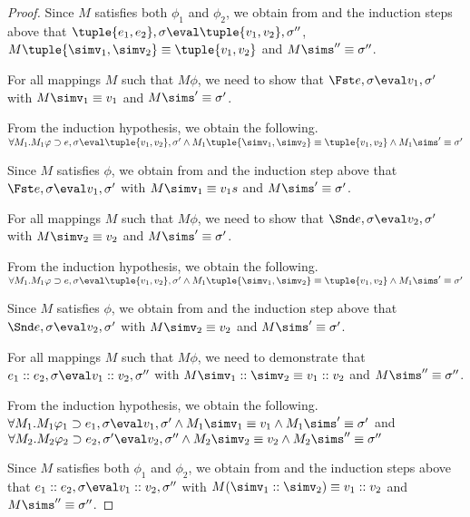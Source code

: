 \begin{proof}
{    Since $M$ satisfies both $\phi_1$ and $\phi_2$,
    we obtain from  and the induction steps above that $\tuple{e_1,e_2},\sigma\eval\tuple{v_1,v_2},\sigma''$, $M\tuple{\simv_1,\simv_2} \equiv \tuple{{v_1},{v_2}}$ and $M\sims''\equiv\sigma''$.
    }

{
  For all mappings $M$ such that $M\phi$, we need to show that
  $\Fst e,\sigma\eval v_1,\sigma'$ with
  $M \simv_1\equiv {v_1}$ and $M\sims'\equiv{\sigma'}$.

  From the induction hypothesis, we obtain the following.\\
  $\forall M_1 . M_1\phi \implies e,\sigma\eval\tuple{v_1,v_2},\sigma'\land M_1\tuple{\simv_1,\simv_2}\equiv \tuple{{v_1},{v_2}}\land M_1\sims'\equiv{\sigma'}$

  Since $M$ satisfies $\phi$,
  we obtain from  and the induction step above that $\Fst e,\sigma\eval v_1,\sigma'$ with $M \simv_1\equiv v_1s$ and $M\sims'\equiv\sigma'$.
  }

{
  For all mappings $M$ such that $M\phi$, we need to show that
  $\Snd e,\sigma\eval v_2,\sigma'$ with $M \simv_2\equiv {v_2}$ and $M\sims'\equiv{\sigma'}$.

  From the induction hypothesis, we obtain the following.\\
  $\forall M_1 . M_1\phi \implies e, \sigma \eval\tuple{{v_1},{v_2}},{\sigma'}\land M_1\tuple{\simv_1,\simv_2}\equiv \tuple{{v_1},{v_2}}\land M_1\sims'\equiv{\sigma'}$

  Since $M$ satisfies $\phi$,
  we obtain from  and the induction step above that $\Snd e,\sigma\eval v_2,\sigma'$ with
  $M \simv_2\equiv {v_2}$ and $M\sims'\equiv{\sigma'}$.
  }

  {
  For all mappings $M$ such that $M\phi$, we need to demonstrate that
  $e_1 :: e_2,\sigma\eval v_1 :: v_2,\sigma''$ with
  $M \simv_1::\simv_2\equiv v_1 :: v_2$ and $M\sims''\equiv \sigma''$.

  From the induction hypothesis, we obtain the following.\\
  $\forall M_1 .  M_1\phi_1 \implies e_1, \sigma \eval v_1, \sigma' \land  M_1\simv_1\equiv{v_1} \land  M_1\sims'\equiv{\sigma'}$ and\\
  $\forall M_2 . M_2\phi_2 \implies e_2,\sigma' \eval v_2,\sigma'' \land M_2\simv_2\equiv{v_2} \wedge M_2\sims''\equiv{\sigma''}$

  Since $M$ satisfies both $\phi_1$ and $\phi_2$,
  we obtain from  and the induction steps above that $e_1 :: e_2,\sigma\eval v_1 :: v_2,\sigma''$ with $M(\simv_1::\simv_2) \equiv {v_1}::{v_2}$ and $M \sims'' \equiv{\sigma''}$.
  }


\end{proof}
